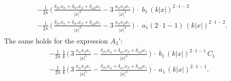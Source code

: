 \begin{align}
\begin{alignedat}{1}
  &- \frac{1}{2\pi} \, \bigg(\, \frac{\delta_{\beta\gamma} x_\alpha + \delta_{\alpha \gamma} x_\beta + \delta_{\alpha \beta} x_\gamma}{|x|^2} - 3\, \frac{x_\alpha x_\beta x_\gamma}{|x|^4} \, \bigg) 
    \,\cdot \; b_1 \, (k|x|)^{2 \cdot 1 - 2}  \\[1.0em]
  &- \frac{1}{2\pi} \, \bigg(\,\frac{\delta_{\beta\gamma} x_\alpha + \delta_{\alpha \gamma} x_\beta + \delta_{\alpha \beta} x_\gamma}{|x|^2} - 3\, \frac{x_\alpha x_\beta x_\gamma}{|x|^4} \, \bigg) 
  \,\cdot \; a_1 (2 \cdot 1 - 1) \, (k|x|)^{2 \cdot 1 - 2} .
  \end{alignedat}
\end{align}
The same holds for the expression $A_3'$:
\begin{align}
  \label{eq:Q4}
  \tag{Q4}
  \begin{alignedat}{1}
    &- \frac{1}{2\pi} \, \frac{1}{k} \, \bigg(\, 3\, \frac{x_\alpha x_\beta x_\gamma}{|x|^5} - \frac{\delta_{\beta\gamma} x_\alpha + \delta_{\alpha\gamma} x_\beta + \delta_{\alpha\beta} x_\gamma}{|x|^3} \, \bigg)  
    \,\cdot \; b_1 \, (k|x|)^{2 \cdot 1 - 1} \, C_1  \\[1.0em]
    &- \frac{1}{2\pi} \, \frac{1}{k} \, \bigg( \, 3\, \frac{x_\alpha x_\beta x_\gamma}{|x|^5} - \frac{\delta_{\beta\gamma} x_\alpha + \delta_{\alpha\gamma} x_\beta + \delta_{\alpha\beta} x_\gamma}{|x|^3} \, \bigg)  
  \,\cdot \; a_1 \, (k|x|)^{2 \cdot 1 - 1} .
  \end{alignedat}
\end{align}
